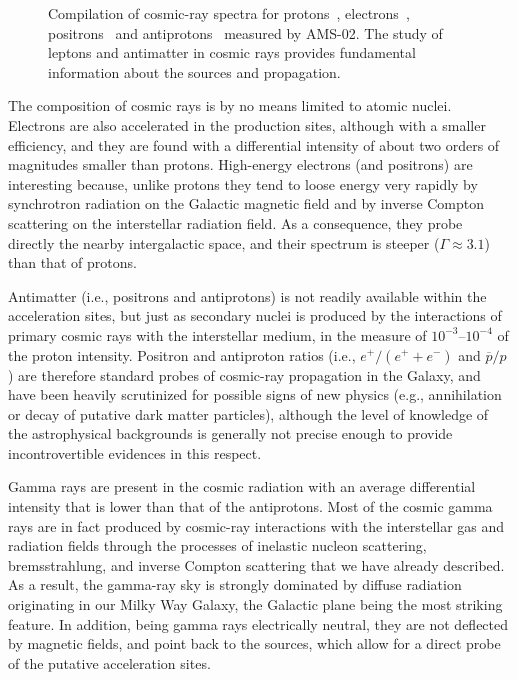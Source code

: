 \begin{figure}[!htbp]
  
  \caption{Compilation of cosmic-ray spectra for protons~\cite{2015PhRvL.114q1103A},
    electrons~\cite{2019PhRvL.122j1101A}, positrons~\cite{2019PhRvL.122d1102A} and
    antiprotons~\cite{2016PhRvL.117i1103A} measured by AMS-02. The study of leptons
    and antimatter in cosmic rays provides fundamental information about the
    sources and propagation.}
  \label{fig:cr_others}
\end{figure}

The composition of cosmic rays is by no means limited to atomic nuclei. Electrons
are also accelerated in the production sites, although with a smaller efficiency,
and they are found with a differential intensity of about two orders of magnitudes
smaller than protons. High-energy electrons (and positrons) are interesting because,
unlike protons they tend to loose energy very rapidly by synchrotron radiation on
the Galactic magnetic field and by inverse Compton scattering on the interstellar
radiation field. As a consequence, they probe directly
the nearby intergalactic space, and their spectrum is steeper ($\Gamma \approx 3.1$)
than that of protons.

Antimatter (i.e., positrons and antiprotons) is not readily available within the
acceleration sites, but just as secondary nuclei is produced by the interactions
of primary cosmic rays with the interstellar medium, in the measure of $10^{-3}$--$10^{-4}$
of the proton intensity. Positron and antiproton ratios (i.e., $e^+ / (e^+ + e^-)$
and $\overline{p} / p$) are therefore standard probes of cosmic-ray propagation in
the Galaxy, and have been heavily scrutinized for possible signs of new physics
(e.g., annihilation or decay of putative dark matter particles), although the level
of knowledge of the astrophysical backgrounds is generally not precise enough to
provide incontrovertible evidences in this respect.

Gamma rays are present in the cosmic radiation with an average differential
intensity that is lower than that of the antiprotons. Most of the cosmic gamma rays
are in fact produced by cosmic-ray interactions with the interstellar gas and radiation
fields through the processes of inelastic nucleon scattering, bremsstrahlung, and
inverse Compton scattering that we have already described. As a result, the gamma-ray
sky is strongly dominated by diffuse radiation originating in our Milky Way Galaxy,
the Galactic plane being the most striking feature. In addition, being gamma rays
electrically neutral, they are not deflected by magnetic fields, and point back
to the sources, which allow for a direct probe of the putative acceleration sites.

